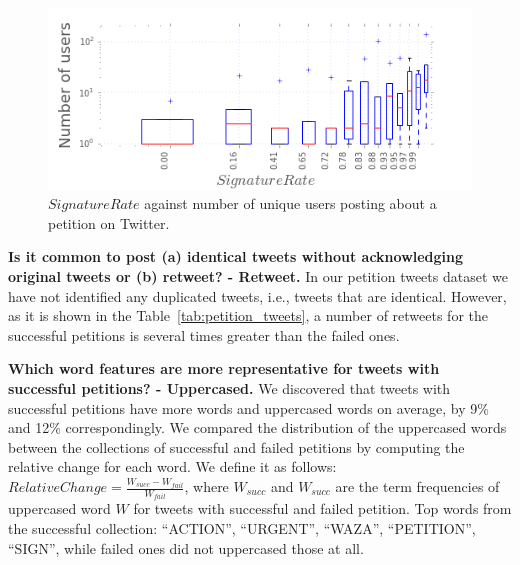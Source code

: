 \begin{figure}
\centering
\includegraphics[width=\columnwidth]{figures/signaturesgoalVSnumusersCampaigns.png}
\caption{$SignatureRate$ against number of unique users posting about a petition on Twitter.}
\label{fig:signatures_vs_users}
\end{figure}

\textbf{Is it common to post (a) identical tweets without acknowledging original tweets or (b) retweet? - Retweet.} In our petition tweets dataset we have not identified any duplicated tweets, i.e., tweets that are identical. However, as it is shown in the Table~\ref{tab:petition_tweets}, a number of retweets for the successful petitions is several times greater than the failed ones.

\textbf{Which word features are more representative for tweets with successful petitions? - Uppercased.} We discovered that tweets with successful petitions have more words and uppercased words on average, by 9\% and 12\% correspondingly. We compared the distribution of the uppercased words between the collections of successful and failed petitions by computing the relative change for each word. We define it as follows: $RelativeChange = \frac{W_{succ} - W_{fail}}{W_{fail}}$, where $W_{succ}$ and $W_{succ}$ are the term frequencies of uppercased word $W$ for tweets with successful and failed petition. Top words from the successful collection: ``ACTION'', ``URGENT'', ``WAZA'', ``PETITION'', ``SIGN'', while failed ones did not uppercased those at all.
